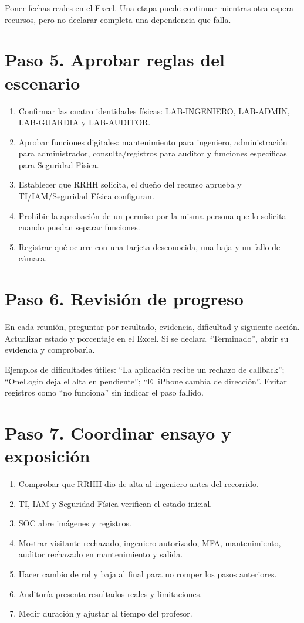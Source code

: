 \documentclass[12pt,a4paper]{article}
\begin{document}
Poner fechas reales en el Excel. Una etapa puede continuar mientras otra espera recursos, pero no declarar completa una dependencia que falla.\par
{}\section*{Paso 5. Aprobar reglas del escenario}
\begin{enumerate}
\item Confirmar las cuatro identidades físicas: LAB-INGENIERO, LAB-ADMIN, LAB-GUARDIA y LAB-AUDITOR.
\item Aprobar funciones digitales: mantenimiento para ingeniero, administración para administrador, consulta/registros para auditor y funciones específicas para Seguridad Física.
\item Establecer que RRHH solicita, el dueño del recurso aprueba y TI/IAM/Seguridad Física configuran.
\item Prohibir la aprobación de un permiso por la misma persona que lo solicita cuando puedan separar funciones.
\item Registrar qué ocurre con una tarjeta desconocida, una baja y un fallo de cámara.
\end{enumerate}
\section*{Paso 6. Revisión de progreso}
En cada reunión, preguntar por resultado, evidencia, dificultad y siguiente acción. Actualizar estado y porcentaje en el Excel. Si se declara “Terminado”, abrir su evidencia y comprobarla.\par
Ejemplos de dificultades útiles: “La aplicación recibe un rechazo de callback”; “OneLogin deja el alta en pendiente”; “El iPhone cambia de dirección”. Evitar registros como “no funciona” sin indicar el paso fallido.\par
{}\section*{Paso 7. Coordinar ensayo y exposición}
\begin{enumerate}
\item Comprobar que RRHH dio de alta al ingeniero antes del recorrido.
\item TI, IAM y Seguridad Física verifican el estado inicial.
\item SOC abre imágenes y registros.
\item Mostrar visitante rechazado, ingeniero autorizado, MFA, mantenimiento, auditor rechazado en mantenimiento y salida.
\item Hacer cambio de rol y baja al final para no romper los pasos anteriores.
\item Auditoría presenta resultados reales y limitaciones.
\item Medir duración y ajustar al tiempo del profesor.
\end{enumerate}
\end{document}
